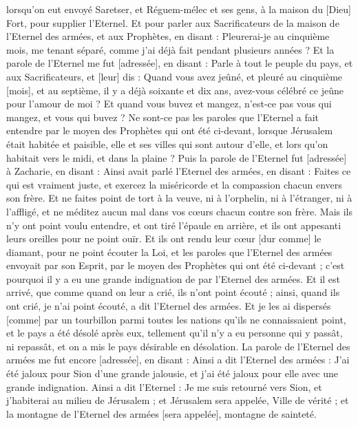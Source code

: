 \begin{multicols}{2}
lorsqu'on eut envoyé Saretser, et Réguem-mélec et ses gens, à la maison du [Dieu] Fort, pour supplier l'Eternel.
Et pour parler aux Sacrificateurs de la maison de l'Eternel des armées, et aux Prophètes, en disant : Pleurerai-je au cinquième mois, me tenant séparé, comme j'ai déjà fait pendant plusieurs années ?
Et la parole de l'Eternel me fut [adressée], en disant :
Parle à tout le peuple du pays, et aux Sacrificateurs, et [leur] dis : Quand vous avez jeûné, et pleuré au cinquième [mois], et au septième, il y a déjà soixante et dix ans, avez-vous célébré ce jeûne pour l’amour de moi ?
Et quand vous buvez et mangez, n'est-ce pas vous qui mangez, et vous qui buvez ?
Ne sont-ce pas les paroles que l'Eternel a fait entendre par le moyen des Prophètes qui ont été ci-devant, lorsque Jérusalem était habitée et paisible, elle et ses villes qui sont autour d'elle, et lors qu'on habitait vers le midi, et dans la plaine ?
Puis la parole de l'Eternel fut [adressée] à Zacharie, en disant :
Ainsi avait parlé l'Eternel des armées, en disant : Faites ce qui est vraiment juste, et exercez la miséricorde et la compassion chacun envers son frère.
Et ne faites point de tort à la veuve, ni à l'orphelin, ni à l'étranger, ni à l'affligé, et ne méditez aucun mal dans vos cœurs chacun contre son frère.
Mais ils n'y ont point voulu entendre, et ont tiré l'épaule en arrière, et ils ont appesanti leurs oreilles pour ne point ouïr.
Et ils ont rendu leur cœur [dur comme] le diamant, pour ne point écouter la Loi, et les paroles que l'Eternel des armées envoyait par son Esprit, par le moyen des Prophètes qui ont été ci-devant ; c'est pourquoi il y a eu une grande indignation de par l'Eternel des armées.
Et il est arrivé, que comme quand on leur a crié, ils n'ont point écouté ; ainsi, quand ils ont crié, je n'ai point écouté, a dit l'Eternel des armées.
Et je les ai dispersés [comme] par un tourbillon parmi toutes les nations qu'ils ne connaissaient point, et le pays a été désolé après eux, tellement qu'il n'y a eu personne qui y passât, ni repassât, et on a mis le pays désirable en désolation.
\VerseOne{}La parole de l'Eternel des armées me fut encore [adressée], en disant :
Ainsi a dit l'Eternel des armées : J'ai été jaloux pour Sion d'une grande jalousie, et j'ai été jaloux pour elle avec une grande indignation.
Ainsi a dit l'Eternel : Je me suis retourné vers Sion, et j'habiterai au milieu de Jérusalem ; et Jérusalem sera appelée, Ville de vérité ; et la montagne de l'Eternel des armées [sera appelée], montagne de sainteté.

\end{multicols}
